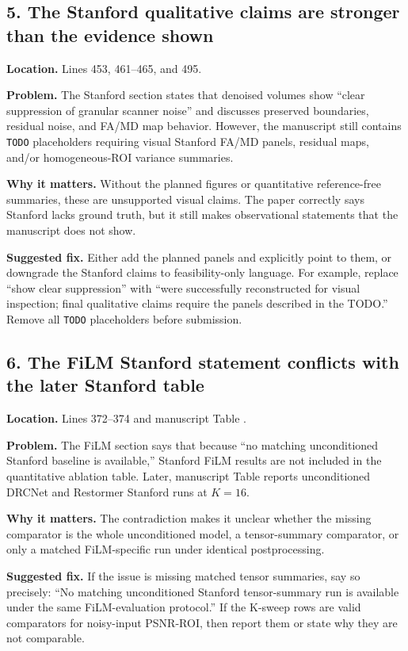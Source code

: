 \documentclass[11pt]{article}
\newcommand{\code}[1]{\texttt{\detokenize{#1}}}
\begin{document}
\subsection*{5. The Stanford qualitative claims are stronger than the evidence shown}

\textbf{Location.} Lines 453, 461--465, and 495.

\textbf{Problem.} The Stanford section states that denoised volumes show ``clear suppression of granular scanner noise'' and discusses preserved boundaries, residual noise, and FA/MD map behavior. However, the manuscript still contains \texttt{TODO} placeholders requiring visual Stanford FA/MD panels, residual maps, and/or homogeneous-ROI variance summaries.

\textbf{Why it matters.} Without the planned figures or quantitative reference-free summaries, these are unsupported visual claims. The paper correctly says Stanford lacks ground truth, but it still makes observational statements that the manuscript does not show.

\textbf{Suggested fix.} Either add the planned panels and explicitly point to them, or downgrade the Stanford claims to feasibility-only language. For example, replace ``show clear suppression'' with ``were successfully reconstructed for visual inspection; final qualitative claims require the panels described in the TODO.'' Remove all \texttt{TODO} placeholders before submission.

\subsection*{6. The FiLM Stanford statement conflicts with the later Stanford table}

\textbf{Location.} Lines 372--374 and manuscript Table \code{tab:stanford_k_sweep}.

\textbf{Problem.} The FiLM section says that because ``no matching unconditioned Stanford baseline is available,'' Stanford FiLM results are not included in the quantitative ablation table. Later, manuscript Table \code{tab:stanford_k_sweep} reports unconditioned DRCNet and Restormer Stanford runs at $K=16$.

\textbf{Why it matters.} The contradiction makes it unclear whether the missing comparator is the whole unconditioned model, a tensor-summary comparator, or only a matched FiLM-specific run under identical postprocessing.

\textbf{Suggested fix.} If the issue is missing matched tensor summaries, say so precisely: ``No matching unconditioned Stanford tensor-summary run is available under the same FiLM-evaluation protocol.'' If the K-sweep rows are valid comparators for noisy-input PSNR-ROI, then report them or state why they are not comparable.
\end{document}
